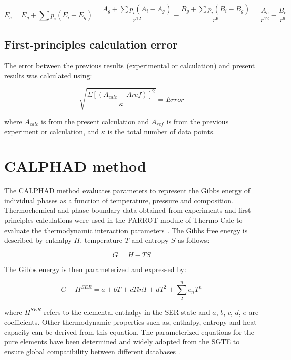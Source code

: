 \begin{equation}
\label{eq: combined_energy}
E_{c} = E_{g} + \sum p_{i} \left( E_{i} - E_{g} \right) = \frac{A_{g} + \sum p_{i} \left( A_{i} - A_{g} \right)}{r^{12}} - \frac{B_{g} + \sum p_{i} \left( B_{i} - B_{g} \right)}{r^{6}} = \frac{A_{c}}{r^{12}} - \frac{B_{c}}{r^{6}}
\end{equation}

\subsection{First-principles calculation error}

The error between the previous results (experimental or calculation) and present results was calculated using:

\begin{equation}
\label{eq: error}
\sqrt{\frac{\Sigma[(A_{calc}-A{ref})]^{2}}{\kappa}} = Error
\end{equation}

\noindent where $A_{calc}$ is from the present calculation and $A_{ref}$ is from the previous experiment or calculation, and $\kappa$ is the total number of data points. 

\section{CALPHAD method}

The CALPHAD method evaluates parameters to represent the Gibbs energy of individual phases as a function of temperature, pressure and composition. Thermochemical and phase boundary data obtained from experiments and first-principles calculations were used in the PARROT module of Thermo-Calc to evaluate the thermodynamic interaction parameters \cite{Andersson2002}. The Gibbs free energy is described by enthalpy $H$, temperature $T$ and entropy $S$ as follows:

\begin{equation}
\label{eq: gibbs}
G = H - T S 
\end{equation}

\noindent The Gibbs energy is then parameterized and expressed by:

\begin{equation}
\label{eq: parameterizaiton}
G - H^{SER} = a + bT + cT ln T + d T^2 + \sum_{2}^{n} e_{n} T^{n}
\end{equation}

\noindent where $H^{SER}$ refers to the elemental enthalpy in the SER state and $a$, $b$, $c$, $d$, $e$ are coefficients. Other thermodynamic properties such as, enthalpy, entropy and heat capacity can be derived from this equation. The parameterized equations for the pure elements have been determined and widely adopted from the SGTE to ensure global compatibility between different databases \cite{Dinsdale1991}.

